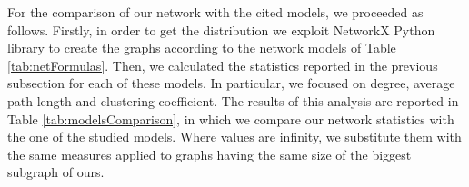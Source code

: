\documentclass[sigchi]{acmart}
\begin{document}
\begin{table}
  \caption{Models topological measures with parameters}
  \label{tab:netFormulas}
\end{table}

For the comparison of our network with the cited models, we proceeded as follows. Firstly, in order to get the distribution we exploit NetworkX Python library \cite{networkX} to create the graphs according to the network models of Table \ref{tab:netFormulas}. Then, we calculated the statistics reported in the previous subsection for each of these models. In particular, we focused on degree, average path length and clustering coefficient. The results of this analysis are reported in Table \ref{tab:modelsComparison}, in which we compare our network statistics with the one of the studied models. Where values are infinity, we substitute them with the same measures applied to graphs having the same size of the biggest subgraph of ours. 
\end{document}
